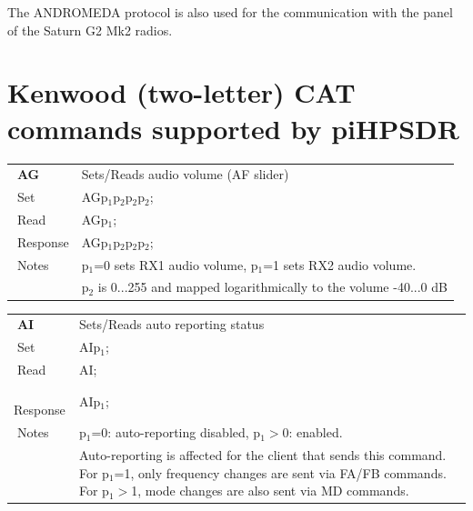 \documentclass[12pt]{book}
\def\pH{pi\-HPSDR\xspace}
\begin{document}
The ANDROMEDA protocol is also used for the communication with the panel of the Saturn G2 Mk2 radios.


%
%



\section[Kenwood CAT commands]{Kenwood (two-letter) CAT commands supported by \pH}

\begin{center}
\begin{tabular}{|p{2cm}|p{11cm}|}
\toprule
$\phantom{\Big|}$\textbf{\large AG} & Sets/Reads audio volume (AF slider) \\\cline{1-2}
$\phantom{\Big|}${\large Set} & {AGp$_1$p$_2$p$_2$p$_2$;} \\\hline
$\phantom{\Big|}${\large Read} & {AGp$_1$;} \\\hline
$\phantom{\Big|}${\large Response} & {AGp$_1$p$_2$p$_2$p$_2$;} \\\hline
$\phantom{\Big|}${\large Notes} & \multicolumn{1}{|p{11cm}|}{p$_1$=0 sets RX1 audio volume, p$_1$=1 sets RX2 audio volume.} \\
& \multicolumn{1}{|p{11cm}|}{p$_2$ is 0...255 and mapped logarithmically to the volume -40...0 dB} \\
\bottomrule
\end{tabular}
\end{center}

\begin{center}
\begin{tabular}{|p{2cm}|p{11cm}|}
\toprule
$\phantom{\Big|}$\textbf{\large AI} & Sets/Reads auto reporting status \\\cline{1-2}
$\phantom{\Big|}${\large Set} & {AIp$_1$;} \\\hline
$\phantom{\Big|}${\large Read} & {AI;} \\\hline
$\phantom{\Big|}${\large Response} & {AIp$_1$;} \\\hline
$\phantom{\Big|}${\large Notes} & \multicolumn{1}{|p{11cm}|}{p$_1$=0: auto-reporting disabled, p$_1$$>$0: enabled.} \\
& \multicolumn{1}{|p{11cm}|}{Auto-reporting is affected for the client that sends this command. For p$_1$=1, only frequency changes are sent via FA/FB commands. For p$_1$$>$1, mode changes are also sent via MD commands.} \\
\bottomrule
\end{tabular}
\end{center}
\end{document}
